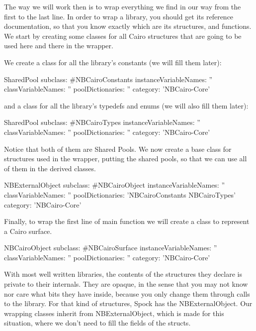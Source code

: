 \documentclass[a4paper,10pt,twoside]{book}
\begin{document}
The way we will work then is to wrap everything we find in
our way from the first to the last line. In order to wrap a
library, you should get its reference documentation, so that
you know exactly which are its structures, and functions.
We start by creating some classes for all Cairo structures
that are going to be used here and there in the wrapper.

We create a class for all the library's constants (we will
fill them later):

\begin{classdef}{}
SharedPool subclass: #NBCairoConstants
	instanceVariableNames: ''
	classVariableNames: ''
	poolDictionaries: ''
	category: 'NBCairo-Core'
\end{classdef}

and a class for all the library's typedefs and enums (we will
also fill them later):

\begin{classdef}{}
SharedPool subclass: #NBCairoTypes
	instanceVariableNames: ''
	classVariableNames: ''
	poolDictionaries: ''
	category: 'NBCairo-Core'
\end{classdef}

Notice that both of them are Shared Pools. We now create a base
class for structures used in the wrapper, putting the shared pools,
so that we can use all of them in the derived classes. 

\begin{classdef}{}
NBExternalObject subclass: #NBCairoObject
	instanceVariableNames: ''
	classVariableNames: ''
	poolDictionaries: 'NBCairoConstants NBCairoTypes'
	category: 'NBCairo-Core'
\end{classdef}

Finally, to wrap the first line of main function we will create a
class to represent a Cairo surface.

\begin{classdef}{}
NBCairoObject subclass: #NBCairoSurface
	instanceVariableNames: ''
	classVariableNames: ''
	poolDictionaries: ''
	category: 'NBCairo-Core'
\end{classdef}

With most well written libraries, the contents of the structures
they declare is private to their internals. They are opaque, in the
sense that you may not know nor care what bits they have inside,
because you only change them through calls to the library.
For that kind of structures, Spock has the NBExternalObject.
Our wrapping classes inherit from NBExternalObject, which is
made for this situation, where we don't need to fill the fields
of the structs.
\end{document}
